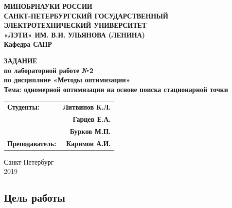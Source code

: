 \documentclass[a4paper,12pt]{article}
\begin{document}
\thispagestyle{empty} %

\begin{centering}
	\textbf{
{\large МИНОБРНАУКИ РОССИИ\\
САНКТ-ПЕТЕРБУРГСКИЙ ГОСУДАРСТВЕННЫЙ\\
ЭЛЕКТРОТЕХНИЧЕСКИЙ УНИВЕРСИТЕТ\\
«ЛЭТИ» ИМ. В.И. УЛЬЯНОВА (ЛЕНИНА)\\
Кафедра САПР}\\
}
\end{centering}


\vspace{7cm}

\begin{centering}
\textbf{{\large 
ЗАДАНИЕ\\
по лабораторной работе №2\\
по дисциплине «Методы оптимизации»\\
Тема:  одномерной оптимизации на основе поиска
стационарной точки\guillemotright\\
}}
\end{centering}

\vspace{4cm}

\begin{tabular}{l r}
    \textbf{{\large Студенты:}}&\hspace{6cm} \textbf{{\large Литвинов К.Л.}}\\
   \textbf{}&\hspace{6cm} \textbf{{\large Гарцев Е.А.}}\\
   \textbf{{}}&\hspace{6cm} \textbf{\large{Бурков М.П.}}\\
    \textbf{{\large Преподаватель:}}&\hspace{6cm} \textbf{{\large Каримов А.И.}}\\
\end{tabular}

\vspace{6cm}


\begin{centering}
	{\large
Санкт-Петербург \\
2019 \\
}
\end{centering}

\newpage
 
\subsection*{Цель работы}
\end{document}
